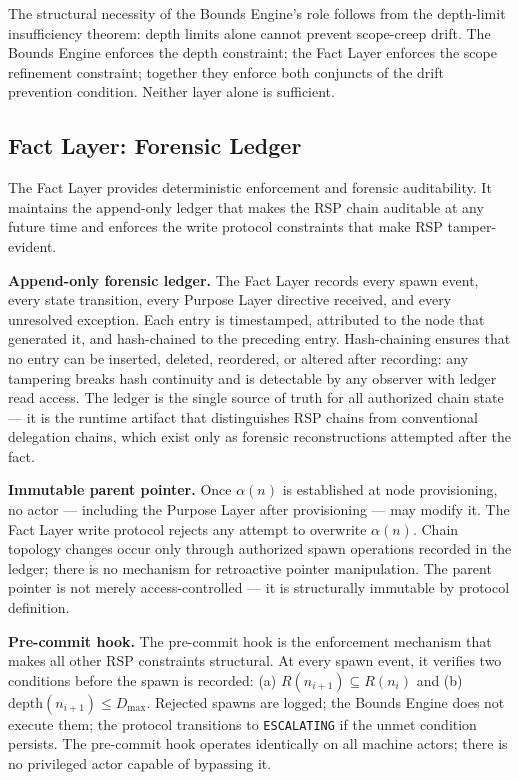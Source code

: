 The structural necessity of the Bounds Engine's role follows from the depth-limit insufficiency theorem: depth limits alone cannot prevent scope-creep drift. The Bounds Engine enforces the depth constraint; the Fact Layer enforces the scope refinement constraint; together they enforce both conjuncts of the drift prevention condition. Neither layer alone is sufficient.

\subsection{Fact Layer: Forensic Ledger}
\label{sec:rs-fact-ledger}

The Fact Layer provides deterministic enforcement and forensic auditability. It maintains the append-only ledger that makes the RSP chain auditable at any future time and enforces the write protocol constraints that make RSP tamper-evident.

\medskip
\noindent\textbf{Append-only forensic ledger.}
The Fact Layer records every spawn event, every state transition, every Purpose Layer directive received, and every unresolved exception. Each entry is timestamped, attributed to the node that generated it, and hash-chained to the preceding entry. Hash-chaining ensures that no entry can be inserted, deleted, reordered, or altered after recording: any tampering breaks hash continuity and is detectable by any observer with ledger read access. The ledger is the single source of truth for all authorized chain state — it is the runtime artifact that distinguishes RSP chains from conventional delegation chains, which exist only as forensic reconstructions attempted after the fact.

\medskip
\noindent\textbf{Immutable parent pointer.}
Once $\alpha(n)$ is established at node provisioning, no actor — including the Purpose Layer after provisioning — may modify it. The Fact Layer write protocol rejects any attempt to overwrite $\alpha(n)$. Chain topology changes occur only through authorized spawn operations recorded in the ledger; there is no mechanism for retroactive pointer manipulation. The parent pointer is not merely access-controlled — it is structurally immutable by protocol definition.

\medskip
\noindent\textbf{Pre-commit hook.}
The pre-commit hook is the enforcement mechanism that makes all other RSP constraints structural. At every spawn event, it verifies two conditions before the spawn is recorded: (a) $R(n_{i+1}) \subseteq R(n_i)$ and (b) $\mathrm{depth}(n_{i+1}) \leq D_{\mathrm{max}}$. Rejected spawns are logged; the Bounds Engine does not execute them; the protocol transitions to \texttt{ESCALATING} if the unmet condition persists. The pre-commit hook operates identically on all machine actors; there is no privileged actor capable of bypassing it.


